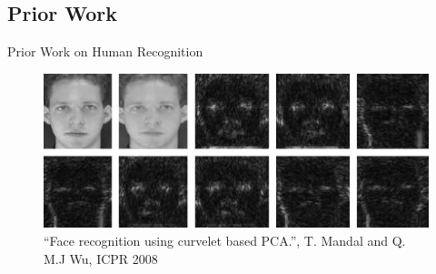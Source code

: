 \documentclass[mathserif]{beamer}
\begin{document}
\subsection{Prior Work}
\begin{frame}{Prior Work on Human Recognition}
    \begin{figure}
        \includegraphics[width=.9\textwidth]{illustrations/related_work/curvelet_faces_mandal09}
        \caption{``Face recognition using curvelet based PCA.'', T. Mandal and Q. M.J Wu, ICPR 2008}
    \end{figure}
\end{frame}
\end{document}
